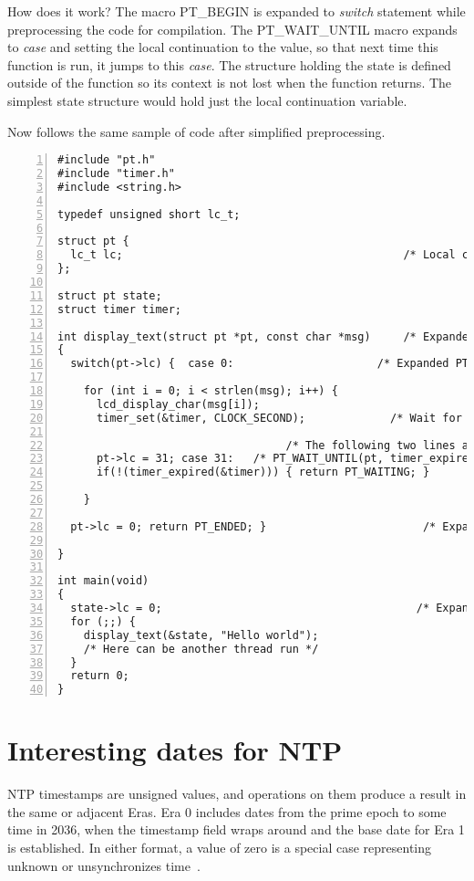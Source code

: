 How does it work? The macro PT\_BEGIN is expanded to {\it switch} statement while preprocessing the
code for compilation.
The PT\_WAIT\_UNTIL macro expands to {\it case} and setting the local continuation
to the value, so that next time this function is run, it jumps to this {\it case}.
The structure holding the state is defined outside of the function so its context is not lost when
the function returns. The simplest state structure would hold just the local continuation variable.

Now follows
the same sample of code after simplified preprocessing.
\begin{lstlisting}[numbers=left]
#include "pt.h"
#include "timer.h"
#include <string.h>

typedef unsigned short lc_t;

struct pt {
  lc_t lc;                                           /* Local continuation */
}; 

struct pt state;
struct timer timer;

int display_text(struct pt *pt, const char *msg)     /* Expanded PT_THREAD */
{
  switch(pt->lc) {  case 0:                      /* Expanded PT_BEGIN(pt); */
  
    for (int i = 0; i < strlen(msg); i++) {
      lcd_display_char(msg[i]);
      timer_set(&timer, CLOCK_SECOND);             /* Wait for one second. */
    
                                   /* The following two lines are expanded */
      pt->lc = 31; case 31:   /* PT_WAIT_UNTIL(pt, timer_expired(&timer)); */
      if(!(timer_expired(&timer))) { return PT_WAITING; }         /* macro */
    
    }
  
  pt->lc = 0; return PT_ENDED; }                        /* Expanded PT_END */
  
}

int main(void)
{
  state->lc = 0;                                       /* Expanded PT_INIT */
  for (;;) {
    display_text(&state, "Hello world");
    /* Here can be another thread run */
  }
  return 0;
}

\end{lstlisting}

\chapter{Interesting dates for NTP}\label{app:dates}
NTP timestamps are unsigned values, and operations on them produce a
result in the same or adjacent Eras.
Era 0 includes dates from the prime epoch to some time in 2036,
when the timestamp field wraps around and the base date for Era 1 is established.
In either format, a value of zero is a special case representing unknown or
unsynchronizes time~\cite{rfc5905}.

